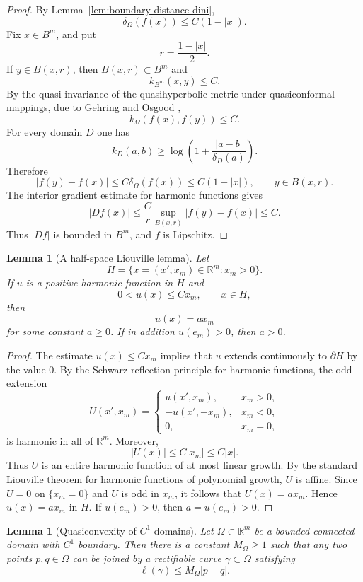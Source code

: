 \documentclass[11pt]{amsart}
\newtheorem{lemma}[theorem]{Lemma}
\theoremstyle{definition}
\theoremstyle{remark}
\newcommand{\R}{\mathbb R}
\begin{document}
\begin{proof}
By Lemma~\ref{lem:boundary-distance-dini},
\[
        \delta_\Omega(f(x))\le C(1-|x|).
\]
Fix \(x\in B^m\), and put
\[
        r=\frac{1-|x|}{2}.
\]
If \(y\in B(x,r)\), then \(B(x,r)\subset B^m\) and
\[
        k_{B^m}(x,y)\le C.
\]
By the quasi-invariance of the quasihyperbolic metric under
quasiconformal mappings, due to Gehring and Osgood
\cite{GehringOsgood1979},
\[
        k_\Omega(f(x),f(y))\le C.
\]
For every domain \(D\) one has
\[
        k_D(a,b)
        \ge
        \log\left(1+\frac{|a-b|}{\delta_D(a)}\right).
\]
Therefore
\[
        |f(y)-f(x)|
        \le
        C\delta_\Omega(f(x))
        \le
        C(1-|x|),
        \qquad y\in B(x,r).
\]
The interior gradient estimate for harmonic functions gives
\[
        |Df(x)|
        \le
        \frac{C}{r}\sup_{B(x,r)}|f(y)-f(x)|
        \le C.
\]
Thus \(|Df|\) is bounded in \(B^m\), and \(f\) is Lipschitz.
\end{proof}

\begin{lemma}[A half-space Liouville lemma]
\label{lem:halfspace-liouville}
Let
\[
        H=\{x=(x',x_m)\in\R^m:x_m>0\}.
\]
If \(u\) is a positive harmonic function in \(H\) and
\[
        0<u(x)\le Cx_m,
        \qquad x\in H,
\]
then
\[
        u(x)=a x_m
\]
for some constant \(a\ge0\).  If in addition \(u(e_m)>0\), then
\(a>0\).
\end{lemma}

\begin{proof}
The estimate \(u(x)\le Cx_m\) implies that \(u\) extends continuously to
\(\partial H\) by the value \(0\).  By the Schwarz reflection principle for
harmonic functions, the odd extension
\[
        U(x',x_m)=
        \begin{cases}
        u(x',x_m), & x_m>0,\\
        -u(x',-x_m), & x_m<0,\\
        0, & x_m=0,
        \end{cases}
\]
is harmonic in all of \(\R^m\).  Moreover,
\[
        |U(x)|\le C|x_m|\le C|x|.
\]
Thus \(U\) is an entire harmonic function of at most linear growth.  By
the standard Liouville theorem for harmonic functions of polynomial growth,
\(U\) is affine.  Since \(U=0\) on \(\{x_m=0\}\) and \(U\) is odd in
\(x_m\), it follows that \(U(x)=a x_m\).  Hence \(u(x)=a x_m\) in \(H\).
If \(u(e_m)>0\), then \(a=u(e_m)>0\).
\end{proof}

\begin{lemma}[Quasiconvexity of \(C^1\) domains]
\label{lem:c1-quasiconvex}
Let \(\Omega\subset\R^m\) be a bounded connected domain with \(C^1\)
boundary. Then there is a constant \(M_\Omega\ge1\) such that any two
points \(p,q\in\Omega\) can be joined by a rectifiable curve
\(\gamma\subset\Omega\) satisfying
\[
        \ell(\gamma)\le M_\Omega |p-q|.
\]
\end{lemma}
\end{document}
